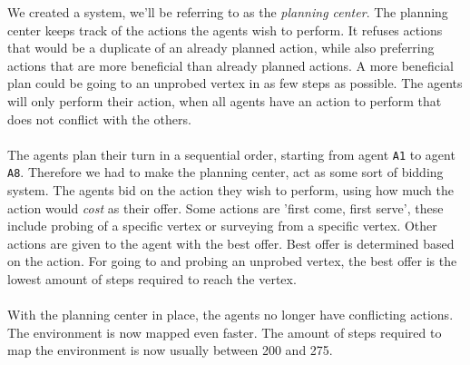 \documentclass[11pt]{report}
\begin{document}
We created a system, we'll be referring to as the \emph{planning center}. The planning center keeps track of the actions the agents wish to perform. It refuses actions that would be a duplicate of an already planned action, while also preferring actions that are more beneficial than already planned actions. A more beneficial plan could be going to an unprobed vertex in as few steps as possible. The agents will only perform their action, when all agents have an action to perform that does not conflict with the others.\\
\\
The agents plan their turn in a sequential order, starting from agent {\tt A1} to agent {\tt A8}. Therefore we had to make the planning center, act as some sort of bidding system. The agents bid on the action they wish to perform, using how much the action would \emph{cost} as their offer. Some actions are 'first come, first serve', these include probing of a specific vertex or surveying from a specific vertex. Other actions are given to the agent with the best offer. Best offer is determined based on the action. For going to and probing an unprobed vertex, the best offer is the lowest amount of steps required to reach the vertex.\\
\\
With the planning center in place, the agents no longer have conflicting actions. The environment is now mapped even faster. The amount of steps required to map the environment is now usually between 200 and 275.
\end{document}
